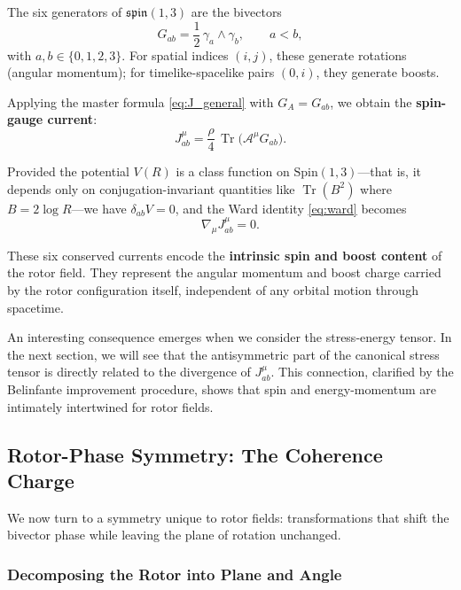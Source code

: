 \documentclass[11pt,a4paper]{article}
\numberwithin{equation}{section}
\theoremstyle{plain}
\theoremstyle{definition}
\theoremstyle{remark}
\DeclareMathOperator{\Tr}{Tr}
\begin{document}
The six generators of $\mathfrak{spin}(1,3)$ are the bivectors
\begin{equation}
G_{ab} = \frac{1}{2}\,\gamma_a\wedge\gamma_b, \qquad a < b,
\end{equation}
with $a,b \in \{0,1,2,3\}$. For spatial indices $(i,j)$, these generate rotations (angular momentum); for timelike-spacelike pairs $(0,i)$, they generate boosts.

Applying the master formula \eqref{eq:J_general} with $G_A = G_{ab}$, we obtain the \textbf{spin-gauge current}:
\begin{equation}
J^{\mu}_{ab} = \frac{\rho}{4}\,\Tr\!\big(\mathcal{A}^\mu G_{ab}\big).
\label{eq:spin-current}
\end{equation}

Provided the potential $V(R)$ is a class function on $\mathrm{Spin}(1,3)$---that is, it depends only on conjugation-invariant quantities like $\Tr(B^2)$ where $B = 2\log R$---we have $\delta_{ab}V = 0$, and the Ward identity \eqref{eq:ward} becomes
\begin{equation}
\nabla_\mu J^{\mu}_{ab} = 0.
\label{eq:spin-conserved}
\end{equation}

These six conserved currents encode the \textbf{intrinsic spin and boost content} of the rotor field. They represent the angular momentum and boost charge carried by the rotor configuration itself, independent of any orbital motion through spacetime.

An interesting consequence emerges when we consider the stress-energy tensor. In the next section, we will see that the antisymmetric part of the canonical stress tensor is directly related to the divergence of $J^\mu_{ab}$. This connection, clarified by the Belinfante improvement procedure, shows that spin and energy-momentum are intimately intertwined for rotor fields.

\subsection{Rotor-Phase Symmetry: The Coherence Charge}

We now turn to a symmetry unique to rotor fields: transformations that shift the bivector phase while leaving the plane of rotation unchanged.

\subsubsection{Decomposing the Rotor into Plane and Angle}
\end{document}
